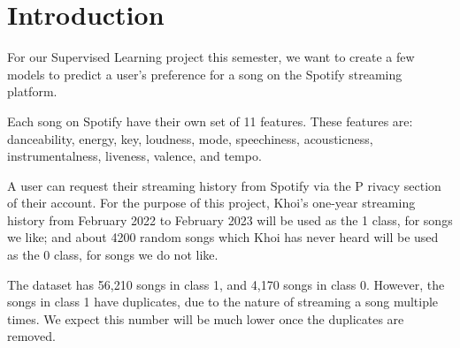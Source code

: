 \section*{Introduction}

For our Supervised Learning project this semester, we want to create a few models to predict a user's preference for a song on the Spotify streaming platform.

Each song on Spotify have their own set of 11 features. These features are: danceability, energy, key, loudness, mode, speechiness, acousticness, instrumentalness, liveness, valence, and tempo.

A user can request their streaming history from Spotify via the P rivacy section of their account. For the purpose of this project, Khoi's one-year streaming history from February 2022 
to February 2023 will be used as the 1 class, for songs we like; and about 4200 random songs which Khoi has never heard will be used as the 0 class, for songs we do not like.

The dataset has 56,210 songs in class 1, and 4,170 songs in class 0. However, the songs in class 1 have duplicates, due to the nature of streaming a song multiple times.
We expect this number will be much lower once the duplicates are removed.